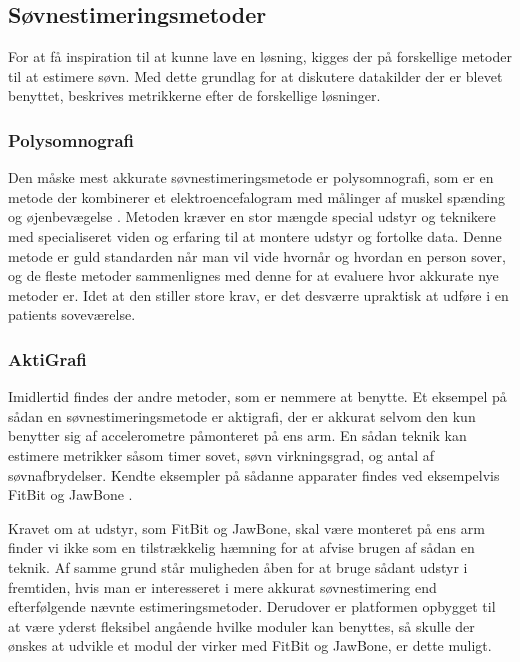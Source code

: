 \subsection{Søvnestimeringsmetoder}
For at få inspiration til at kunne lave en løsning, kigges der på forskellige metoder til at estimere søvn.
Med dette grundlag for at diskutere datakilder der er blevet benyttet, beskrives metrikkerne efter de forskellige løsninger.

\subsubsection{Polysomnografi}\label{sec:polysomnografi}
Den måske mest akkurate søvnestimeringsmetode er polysomnografi, som er en metode der kombinerer et elektroencefalogram med målinger af muskel spænding og øjenbevægelse \citep{misc:polysomnografi,misc:polysomnography}.
Metoden kræver en stor mængde special udstyr og teknikere med specialiseret viden og erfaring til at montere udstyr og fortolke data.
Denne metode er guld standarden når man vil vide hvornår og hvordan en person sover, og de fleste metoder sammenlignes med denne for at evaluere hvor akkurate nye metoder er. 
Idet at den stiller store krav, er det desværre upraktisk at udføre i en patients soveværelse.

\subsubsection{AktiGrafi}
Imidlertid findes der andre metoder, som er nemmere at benytte.
Et eksempel på sådan en søvnestimeringsmetode er aktigrafi, der er akkurat selvom den kun benytter sig af accelerometre påmonteret på ens arm.
En sådan teknik kan estimere metrikker såsom timer sovet, søvn virkningsgrad, og antal af søvnafbrydelser.
Kendte eksempler på sådanne apparater findes ved eksempelvis FitBit og JawBone \citep{misc:fitbitSleepTracking,misc:jawBoneSleepTracking}.

Kravet om at udstyr, som FitBit og JawBone, skal være monteret på ens arm finder vi ikke som en tilstrækkelig hæmning for at afvise brugen af sådan en teknik.
Af samme grund står muligheden åben for at bruge sådant udstyr i fremtiden, hvis man er interesseret i mere akkurat søvnestimering end efterfølgende nævnte estimeringsmetoder.
Derudover er platformen opbygget til at være yderst fleksibel angående hvilke moduler kan benyttes, så skulle der ønskes at udvikle et modul der virker med FitBit og JawBone, er dette muligt.

